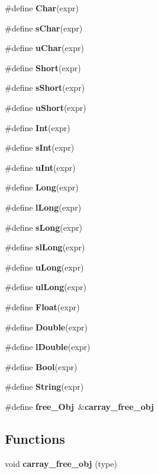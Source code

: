 \begin{DoxyCompactItemize}
\item 
\#define {\bfseries Char}(expr)
\item 
\#define {\bfseries s\+Char}(expr)
\item 
\#define {\bfseries u\+Char}(expr)
\item 
\#define {\bfseries Short}(expr)
\item 
\#define {\bfseries s\+Short}(expr)
\item 
\#define {\bfseries u\+Short}(expr)
\item 
\#define {\bfseries Int}(expr)
\item 
\#define {\bfseries s\+Int}(expr)
\item 
\#define {\bfseries u\+Int}(expr)
\item 
\#define {\bfseries Long}(expr)
\item 
\#define {\bfseries l\+Long}(expr)
\item 
\#define {\bfseries s\+Long}(expr)
\item 
\#define {\bfseries sl\+Long}(expr)
\item 
\#define {\bfseries u\+Long}(expr)
\item 
\#define {\bfseries ul\+Long}(expr)
\item 
\#define {\bfseries Float}(expr)
\item 
\#define {\bfseries Double}(expr)
\item 
\#define {\bfseries l\+Double}(expr)
\item 
\#define {\bfseries Bool}(expr)
\item 
\#define {\bfseries String}(expr)
\item 
\#define {\bfseries free\+\_\+\+Obj}~\&{\bf carray\+\_\+free\+\_\+obj}\label{group__prep__group_ga7d141aff3ea5c308d91ba1d75d82910c}

\end{DoxyCompactItemize}
\subsection*{Functions}
\begin{DoxyCompactItemize}
\item 
void {\bf carray\+\_\+free\+\_\+obj} (type)
\end{DoxyCompactItemize}
